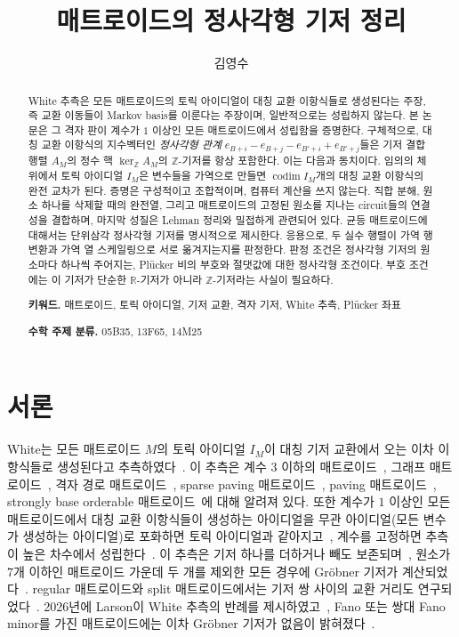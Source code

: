 \documentclass[11pt,a4paper]{article}
\title{매트로이드의 정사각형 기저 정리}
\author{김영수}
\date{}
\theoremstyle{plain}
\theoremstyle{definition}
\newcommand{\R}{\mathbb R}
\newcommand{\Z}{\mathbb Z}
\newcommand{\AM}{A_M}
\newcommand{\kerZ}{\ker_{\Z}\!A_M}
\begin{document}
\maketitle

\begin{abstract}
\noindent White 추측은 모든 매트로이드의 토릭 아이디얼이 대칭 교환 이항식들로 생성된다는 주장, 즉 교환 이동들이 Markov basis를 이룬다는 주장이며, 일반적으로는 성립하지 않는다. 본 논문은 그 격자 판이 계수가 $1$ 이상인 모든 매트로이드에서 성립함을 증명한다. 구체적으로, 대칭 교환 이항식의 지수벡터인 \emph{정사각형 관계} $e_{B+i}-e_{B+j}-e_{B'+i}+e_{B'+j}$들은 기저 결합 행렬 $\AM$의 정수 핵 $\kerZ$의 $\Z$\nobreakdash-기저를 항상 포함한다. 이는 다음과 동치이다. 임의의 체 위에서 토릭 아이디얼 $I_M$은 변수들을 가역으로 만들면 $\operatorname{codim} I_M$개의 대칭 교환 이항식의 완전 교차가 된다. 증명은 구성적이고 조합적이며, 컴퓨터 계산을 쓰지 않는다. 직합 분해, 원소 하나를 삭제할 때의 완전열, 그리고 매트로이드의 고정된 원소를 지나는 circuit들의 연결성을 결합하며, 마지막 성질은 Lehman 정리와 밀접하게 관련되어 있다. 균등 매트로이드에 대해서는 단위삼각 정사각형 기저를 명시적으로 제시한다. 응용으로, 두 실수 행렬이 가역 행 변환과 가역 열 스케일링으로 서로 옮겨지는지를 판정한다. 판정 조건은 정사각형 기저의 원소마다 하나씩 주어지는, Plücker 비의 부호와 절댓값에 대한 정사각형 조건이다. 부호 조건에는 이 기저가 단순한 $\R$\nobreakdash-기저가 아니라 $\Z$\nobreakdash-기저라는 사실이 필요하다.

\vspace{1.2em}\noindent\textbf{키워드.} 매트로이드, 토릭 아이디얼, 기저 교환, 격자 기저, White 추측, Plücker 좌표

\smallskip\noindent\textbf{수학 주제 분류.} 05B35, 13F65, 14M25
\end{abstract}

\section{서론}\label{sec:intro}
White는 모든 매트로이드 $M$의 토릭 아이디얼 $I_M$이 대칭 기저 교환에서 오는 이차 이항식들로 생성된다고 추측하였다~\cite{W80}. 이 추측은 계수 $3$ 이하의 매트로이드~\cite{Ka10}, 그래프 매트로이드~\cite{Bl08}, 격자 경로 매트로이드~\cite{Sc11}, sparse paving 매트로이드~\cite{Bo13}, paving 매트로이드~\cite{YY25}, strongly base orderable 매트로이드~\cite{LM14}에 대해 알려져 있다. 또한 계수가 $1$ 이상인 모든 매트로이드에서 대칭 교환 이항식들이 생성하는 아이디얼을 무관 아이디얼(모든 변수가 생성하는 아이디얼)로 포화하면 토릭 아이디얼과 같아지고~\cite{LM14}, 계수를 고정하면 추측이 높은 차수에서 성립한다~\cite{La21}. 이 추측은 기저 하나를 더하거나 빼도 보존되며~\cite{HMW25}, 원소가 $7$개 이하인 매트로이드 가운데 두 개를 제외한 모든 경우에 Gröbner 기저가 계산되었다~\cite{HHKS20}. regular 매트로이드와 split 매트로이드에서는 기저 쌍 사이의 교환 거리도 연구되었다~\cite{BMS24,BS24}. 2026년에 Larson이 White 추측의 반례를 제시하였고~\cite{Lar26}, Fano 또는 쌍대 Fano minor를 가진 매트로이드에는 이차 Gröbner 기저가 없음이 밝혀졌다~\cite{BCLLM26,DFMR26}.
\end{document}

